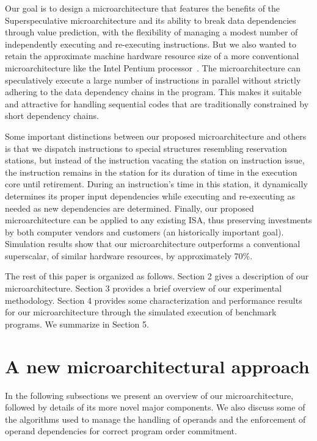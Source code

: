 \documentclass[10pt,dvips]{article}
\begin{document}
Our goal is to design a microarchitecture
that features the benefits of the Superspeculative 
microarchitecture and its ability to break data
dependencies through value prediction, with the flexibility
of managing a modest number of independently executing and re-executing
instructions.
But we also wanted to retain the approximate machine hardware resource
size of a
more conventional microarchitecture like the
Intel Pentium processor~\cite{hinton01pentium}.
The microarchitecture can speculatively execute a large
number of instructions in parallel without strictly adhering to
the data dependency chains in the program.  This makes it
suitable and attractive for handling sequential codes that are
traditionally constrained by short dependency chains.

Some important distinctions between our proposed microarchitecture and
others is that we dispatch instructions to special structures
resembling reservation stations, but instead of the instruction
vacating the station on instruction issue, the instruction
remains in the station for its duration of time in the execution
core until retirement.  During an instruction's time in this
station, it dynamically determines its proper input dependencies
while executing and re-executing as needed as new dependencies
are determined.
Finally, our proposed microarchitecture can
be applied to any existing ISA, thus preserving investments
by both computer vendors and customers (an historically important goal).  
Simulation results show that our microarchitecture outperforms
a conventional superscalar, of similar hardware resources, by
approximately 70\%.

The rest of this paper is organized as follows.
Section 2 gives a description of our microarchitecture.
Section 3 provides a brief overview of our experimental methodology.
Section 4 provides some characterization and performance 
results for our microarchitecture through the simulated
execution of benchmark programs.
We summarize in Section 5.
%
\vspace{-0.15in}
\section{A new microarchitectural approach}
%
In the following subsections we present an
overview of our microarchitecture, followed by details
of its more novel major components.
We also discuss some of the algorithms used to manage
the handling of operands and the enforcement of
operand dependencies for correct program order commitment.
%
\end{document}
